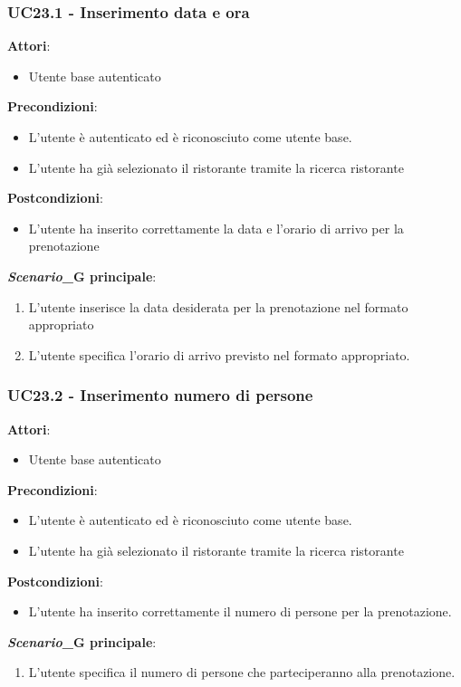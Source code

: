 \subsubsection{UC23.1 - Inserimento data e ora}\label{usecase:23_1}
\textbf{Attori}:
\begin{itemize}
    \item Utente base autenticato
\end{itemize}
\textbf{Precondizioni}:
\begin{itemize}
    \item L'utente è autenticato ed è riconosciuto come utente base.
    \item L'utente ha già selezionato il ristorante tramite la ricerca ristorante 
\end{itemize}
\textbf{Postcondizioni}:
\begin{itemize}
    \item L'utente ha inserito correttamente la data e l'orario di arrivo per la prenotazione
\end{itemize}
\textbf{\textit{Scenario}_G principale}:
\begin{enumerate}
    \item L'utente inserisce la data desiderata per la prenotazione nel formato appropriato
    \item L'utente specifica l'orario di arrivo previsto nel formato appropriato.
\end{enumerate}



\subsubsection{UC23.2 - Inserimento numero di persone}\label{usecase:23_2}
\textbf{Attori}:
\begin{itemize}
    \item Utente base autenticato
\end{itemize}
\textbf{Precondizioni}:
\begin{itemize}
    \item L'utente è autenticato ed è riconosciuto come utente base.
    \item L'utente ha già selezionato il ristorante tramite la ricerca ristorante 
\end{itemize}
\textbf{Postcondizioni}:
\begin{itemize}
    \item L'utente ha inserito correttamente il numero di persone per la prenotazione.
\end{itemize}
\textbf{\textit{Scenario}_G principale}:
\begin{enumerate}
    \item L'utente specifica il numero di persone che parteciperanno alla prenotazione.
\end{enumerate}


